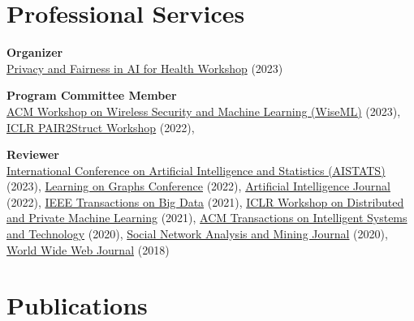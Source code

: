 \documentclass[10pt]{article}
\begin{document}
\section{Professional Services}

\begin{outerlist}
	\item \textbf{Organizer}\\
	\href{https://priv-fair-ai-uk.github.io}{Privacy and Fairness in AI for Health Workshop} (2023)

	\item \textbf{Program Committee Member}\\
	\href{https://wisec2023.surrey.ac.uk/wiseml2023/}{ACM Workshop on Wireless Security and Machine Learning (WiseML)} (2023),
	\href{https://pair2struct-workshop.github.io/}{ICLR PAIR2Struct Workshop} (2022),

	\item \textbf{Reviewer}\\
	\href{http://aistats.org/aistats2023/}{International Conference on Artificial Intelligence and Statistics (AISTATS)} (2023),
	\href{https://logconference.org/}{Learning on Graphs Conference} (2022),
	\href{https://www.journals.elsevier.com/artificial-intelligence}{Artificial Intelligence Journal} (2022),
	\href{https://ieeexplore.ieee.org/xpl/RecentIssue.jsp?punumber=6687317}{IEEE Transactions on Big Data} (2021),
	\href{https://dp-ml.github.io/2021-workshop-ICLR/}{ICLR Workshop on Distributed and Private Machine Learning} (2021),
	\href{https://dl.acm.org/journal/tist}{ACM Transactions on Intelligent Systems and Technology} (2020),
	\href{https://www.springer.com/journal/13278}{Social Network Analysis and Mining Journal} (2020),
	\href{https://www.springer.com/journal/11280}{World Wide Web Journal} (2018)

\end{outerlist}

\section{Publications}
\end{document}

